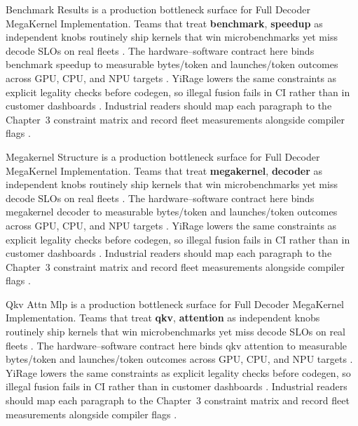 Benchmark Results is a production bottleneck surface for Full Decoder MegaKernel Implementation. Teams that treat \textbf{benchmark}, \textbf{speedup} as independent knobs routinely ship kernels that win microbenchmarks yet miss decode SLOs on real fleets \citep{liu2024deepseekv3,memoryfloor2026}. The hardware--software contract here binds benchmark speedup to measurable bytes/token and launches/token outcomes across GPU, CPU, and NPU targets \citep{patel2025llminference,nvidia2022hopper}. YiRage lowers the same constraints as explicit legality checks before codegen, so illegal fusion fails in CI rather than in customer dashboards \citep{taxbreak2026,semianalysis2024tma}. Industrial readers should map each paragraph to the Chapter~3 constraint matrix and record fleet measurements alongside compiler flags \citep{memoryfloor2026,amd2024xdna}.

Megakernel Structure is a production bottleneck surface for Full Decoder MegaKernel Implementation. Teams that treat \textbf{megakernel}, \textbf{decoder} as independent knobs routinely ship kernels that win microbenchmarks yet miss decode SLOs on real fleets \citep{patel2025llminference,nvidia2022hopper}. The hardware--software contract here binds megakernel decoder to measurable bytes/token and launches/token outcomes across GPU, CPU, and NPU targets \citep{taxbreak2026,semianalysis2024tma}. YiRage lowers the same constraints as explicit legality checks before codegen, so illegal fusion fails in CI rather than in customer dashboards \citep{memoryfloor2026,amd2024xdna}. Industrial readers should map each paragraph to the Chapter~3 constraint matrix and record fleet measurements alongside compiler flags \citep{nvidia2022hopper,amd2024aie}.

Qkv Attn Mlp is a production bottleneck surface for Full Decoder MegaKernel Implementation. Teams that treat \textbf{qkv}, \textbf{attention} as independent knobs routinely ship kernels that win microbenchmarks yet miss decode SLOs on real fleets \citep{taxbreak2026,semianalysis2024tma}. The hardware--software contract here binds qkv attention to measurable bytes/token and launches/token outcomes across GPU, CPU, and NPU targets \citep{memoryfloor2026,amd2024xdna}. YiRage lowers the same constraints as explicit legality checks before codegen, so illegal fusion fails in CI rather than in customer dashboards \citep{nvidia2022hopper,amd2024aie}. Industrial readers should map each paragraph to the Chapter~3 constraint matrix and record fleet measurements alongside compiler flags \citep{semianalysis2024tma,dlbook}.

